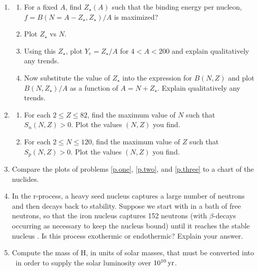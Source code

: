 \begin{enumerate}
\item 
\begin{enumerate}
\item For a fixed $A$, find $Z_\star(A)$ such that the binding energy per nucleon, $f = B(N=A-Z_{\star},Z_{\star})/A$ is maximized?  
\item\label{p.one} Plot $Z_{\star}$ vs $N$.
\item Using this $Z_{\star}$, plot $Y_{e}=Z_{\star}/A$ for $4 < A < 200$ and explain qualitatively any trends.
\item Now substitute the value of $Z_{\star}$ into the expression for $B(N,Z)$ and plot $B(N,Z_{\star})/A$ as a function of $A = N + Z_{\star}$. Explain qualitatively any trends.
\end{enumerate}
\item
\begin{enumerate}
\item\label{p.two} For each $2\le Z\le 82$, find the maximum value of $N$ such that $S_{n}(N,Z) > 0$.  Plot the values $(N,Z)$ you find.  
\item\label{p.three} For each $2\le N\le 120$, find the maximum value of $Z$ such that $S_{p}(N,Z) > 0$. Plot the values $(N,Z)$ you find. 
\end{enumerate}

\item Compare the plots of problems \ref{p.one}, \ref{p.two}, and \ref{p.three} to a chart of the nuclides.

\item In the r-process, a heavy seed nucleus captures a large number of neutrons and then decays back to stability.  Suppose we start with \iron[56] in a bath of free neutrons, so that the iron nucleus captures 152 neutrons (with $\beta$-decays occurring as necessary to keep the nucleus bound) until it reaches the stable nucleus \lead[208].  Is this process exothermic or endothermic? Explain your answer.

\item Compute the mass of H, in units of solar masses, that must be converted into \helium\ in order to supply the solar luminosity over $10^{10}\,\mathrm{yr}$.
\end{enumerate}

 